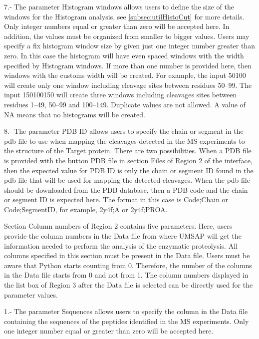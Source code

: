 \num{7}.- The parameter Histogram windows\label{par:tarprotHist} allows users to define the size of the windows for the Histogram analysis, see \autoref{subsec:utilHistoCut} for more details. Only integer numbers equal or greater than zero will be accepted here. In addition, the values must be organized from smaller to bigger values. Users may specify a fix histogram window size by given just one integer number greater than zero. In this case the histogram will have even spaced windows with the width specified by Histogram windows. If more than one number is provided here, then windows with the customs width will be created. For example, the input \numlist{50 100} will create only one window including cleavage sites between residues \numrange{50}{99}. The input \numlist{1 50 100 150} will create three windows including cleavages sites between residues \numrange{1}{49}, \numrange{50}{99} and \numrange{100}{149}. Duplicate values are not allowed. A value of NA means that no histograms will be created.

\num{8}.- The parameter PDB ID\label{par:tarprotPdbID} allows users to specify the chain or segment in the pdb file to use when mapping the cleavages detected in the MS experiments to the structure of the Target protein. There are two possibilities. When a PDB file is provided with the button PDB file in section Files of Region \num{2} of the interface, then the expected value for PDB ID is only the chain or segment ID found in the pdb file that will be used for mapping the detected cleavages. When the pdb file should be downloaded from the PDB database, then a PDB code and the chain or segment ID is expected here. The format in this case is Code;Chain or Code;SegmentID, for example, 2y4f;A or 2y4f;PROA. 

Section Column numbers of Region \num{2} contains five parameters. Here, users provide the column numbers in the Data file from where UMSAP will get the information needed to perform the analysis of the enzymatic proteolysis. All columns specified  in this section must be present in the Data file. Users must be aware that Python starts counting from \num{0}. Therefore, the number of the columns in the Data file starts from \num{0} and not from \num{1}. The column numbers displayed in the list box of Region \num{3} after the Data file is selected can be directly used for the parameter values.  

\num{1}.- The parameter Sequences allows users to specify the column in the Data file containing the sequences of the peptides identified in the MS experiments. Only one integer number equal or greater than zero will be accepted here.

